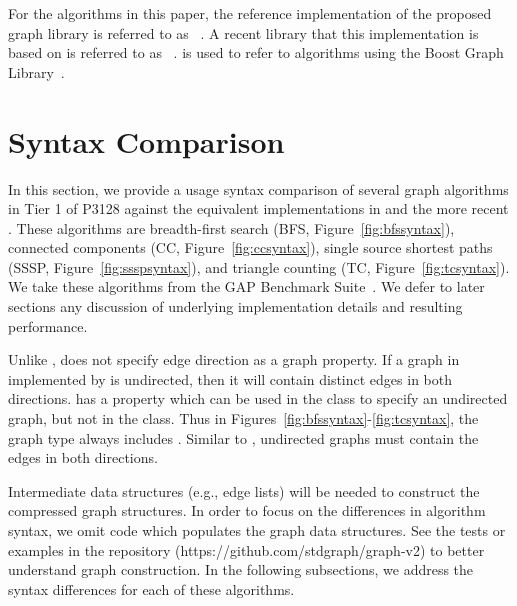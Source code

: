 \clearpage

For the algorithms in this paper, the reference implementation of the proposed graph library is referred to as \stdgraph~\cite{REF_stdgraph_library}. A recent library that this implementation is based on is referred to as \nwgraph~\cite{REF_nwgraph_paper,REF_nwgraph_library}.  \bgl is used to refer to algorithms using the Boost Graph Library~\cite{BGL}.  



\section{Syntax Comparison} \label{syntax}
In this section, we provide a usage syntax comparison of several 
graph algorithms in Tier 1 of P3128 against the equivalent implementations in 
\bgl and the more recent \nwgraph.
These algorithms are breadth-first search (BFS, Figure~\ref{fig:bfssyntax}),
connected components (CC, Figure~\ref{fig:ccsyntax}),
single source shortest paths (SSSP, Figure~\ref{fig:ssspsyntax}),
and triangle counting (TC, Figure~\ref{fig:tcsyntax}).
We take these algorithms from the GAP Benchmark Suite~\cite{beamer2015gap}.
We defer to later sections any discussion of
underlying implementation details and resulting performance.

Unlike \bgl, \stdgraph does not specify edge direction as a graph property.
If a graph in \stdgraph implemented by 
is undirected, then it will contain distinct edges in both directions.
\bgl has a  property
which can be used in the  class
to specify an undirected graph, but
not in the  class.
Thus in Figures~\ref{fig:bfssyntax}-\ref{fig:tcsyntax}, the \bgl graph type 
always includes .
Similar to \stdgraph, undirected graphs must contain the edges in both directions.

Intermediate data structures (e.g., edge lists) will be needed
to construct the compressed graph structures.
In order to focus on the differences in algorithm syntax, we omit
code which populates the graph data structures.
See the tests or examples in the \stdgraph repository (https://github.com/stdgraph/graph-v2) to better understand
graph construction. 
In the following subsections, we address the syntax differences for each of
these algorithms.

